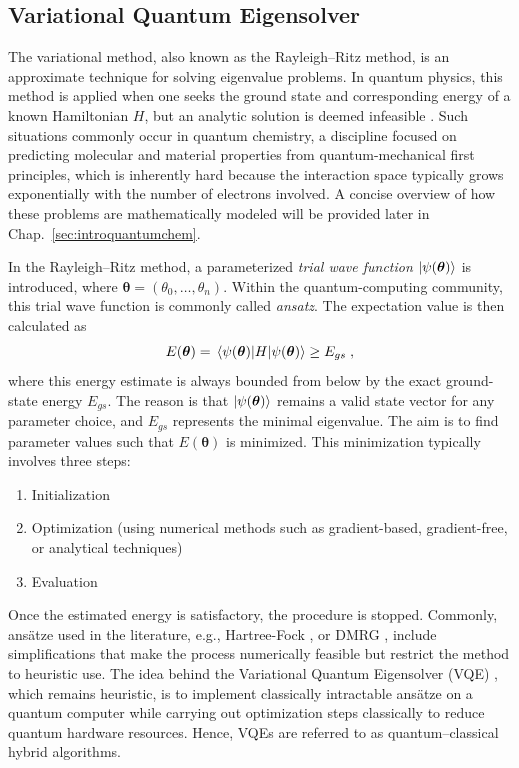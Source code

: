 \documentclass[../main.tex]{subfiles}
\begin{document}
\subsection{Variational Quantum Eigensolver}\label{sec:vqe}

The variational method, also known as the Rayleigh–Ritz method, is an approximate technique for solving eigenvalue problems. In quantum physics, this method is applied when one seeks the ground state and corresponding energy of a known Hamiltonian $H$, but an analytic solution is deemed infeasible \cite{zettili2009quantum}. Such situations commonly occur in quantum chemistry, a discipline focused on predicting molecular and material properties from quantum-mechanical first principles, which is inherently hard because the interaction space typically grows exponentially with the number of electrons involved. A concise overview of how these problems are mathematically modeled will be provided later in Chap.~\ref{sec:introquantumchem}. 

In the Rayleigh–Ritz method, a parameterized \textit{trial wave function} $\ket{\psi(\bm{\theta})}$ is introduced, where $\bm{\theta} = (\theta_0, \dots, \theta_n)$. Within the quantum-computing community, this trial wave function is commonly called \textit{ansatz}. The expectation value is then calculated as 
\begin{equation}
    E (\bm{\theta}) = \expval{H}{\psi{(\bm{\theta})}}\geq E_{gs} \;,
\end{equation} where this energy estimate is always bounded from below by the exact ground-state energy $E_{gs}$. The reason is that $\ket{\psi(\bm{\theta})}$ remains a valid state vector for any parameter choice, and $E_{gs}$ represents the minimal eigenvalue. The aim is to find parameter values such that $E (\bm{\theta})$ is minimized. This minimization typically involves three steps:
\begin{enumerate}
    \item Initialization 
    \item Optimization (using numerical methods such as gradient-based, gradient-free, or analytical techniques)
    \item Evaluation 
\end{enumerate}
Once the estimated energy is satisfactory, the procedure is stopped. Commonly, ansätze used in the literature, e.g., Hartree-Fock \cite{slater1951simplification}, or \ac{DMRG}  \cite{schollwock2005density}, include simplifications that make the process numerically feasible but restrict the method to heuristic use. The idea behind the Variational Quantum Eigensolver (VQE) \cite{peruzzo2014variational,kandala2017hardware,tilly2022variational,mcclean2016theory}, which remains heuristic, is to implement classically intractable ansätze on a quantum computer while carrying out optimization steps classically to reduce quantum hardware resources. Hence, VQEs are referred to as quantum–classical hybrid algorithms. 
\end{document}
